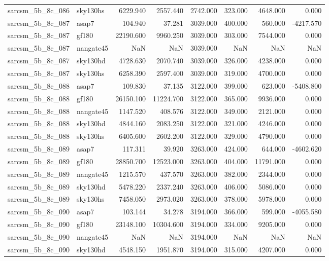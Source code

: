\begin{tabular}{llrrrrrr}
sarcsm\_5b\_8c\_086 & sky130hs & 6229.940 & 2557.440 & 2742.000 & 323.000 & 4648.000 & 0.000 \\
sarcsm\_5b\_8c\_087 & asap7 & 104.940 & 37.281 & 3039.000 & 400.000 & 560.000 & -4217.570 \\
sarcsm\_5b\_8c\_087 & gf180 & 22190.600 & 9960.250 & 3039.000 & 303.000 & 7544.000 & 0.000 \\
sarcsm\_5b\_8c\_087 & nangate45 & NaN & NaN & 3039.000 & NaN & NaN & NaN \\
sarcsm\_5b\_8c\_087 & sky130hd & 4728.630 & 2070.740 & 3039.000 & 326.000 & 4238.000 & 0.000 \\
sarcsm\_5b\_8c\_087 & sky130hs & 6258.390 & 2597.400 & 3039.000 & 319.000 & 4700.000 & 0.000 \\
sarcsm\_5b\_8c\_088 & asap7 & 109.830 & 37.135 & 3122.000 & 399.000 & 623.000 & -5408.800 \\
sarcsm\_5b\_8c\_088 & gf180 & 26150.100 & 11224.700 & 3122.000 & 365.000 & 9936.000 & 0.000 \\
sarcsm\_5b\_8c\_088 & nangate45 & 1147.520 & 408.576 & 3122.000 & 349.000 & 2121.000 & 0.000 \\
sarcsm\_5b\_8c\_088 & sky130hd & 4844.160 & 2083.250 & 3122.000 & 321.000 & 4246.000 & 0.000 \\
sarcsm\_5b\_8c\_088 & sky130hs & 6405.600 & 2602.200 & 3122.000 & 329.000 & 4790.000 & 0.000 \\
sarcsm\_5b\_8c\_089 & asap7 & 117.311 & 39.920 & 3263.000 & 424.000 & 644.000 & -4602.620 \\
sarcsm\_5b\_8c\_089 & gf180 & 28850.700 & 12523.000 & 3263.000 & 404.000 & 11791.000 & 0.000 \\
sarcsm\_5b\_8c\_089 & nangate45 & 1215.570 & 437.570 & 3263.000 & 382.000 & 2344.000 & 0.000 \\
sarcsm\_5b\_8c\_089 & sky130hd & 5478.220 & 2337.240 & 3263.000 & 406.000 & 5086.000 & 0.000 \\
sarcsm\_5b\_8c\_089 & sky130hs & 7458.050 & 2973.020 & 3263.000 & 378.000 & 5978.000 & 0.000 \\
sarcsm\_5b\_8c\_090 & asap7 & 103.144 & 34.278 & 3194.000 & 366.000 & 599.000 & -4055.580 \\
sarcsm\_5b\_8c\_090 & gf180 & 23148.100 & 10304.600 & 3194.000 & 334.000 & 9205.000 & 0.000 \\
sarcsm\_5b\_8c\_090 & nangate45 & NaN & NaN & 3194.000 & NaN & NaN & NaN \\
sarcsm\_5b\_8c\_090 & sky130hd & 4548.150 & 1951.870 & 3194.000 & 315.000 & 4207.000 & 0.000 \\

\end{tabular}
